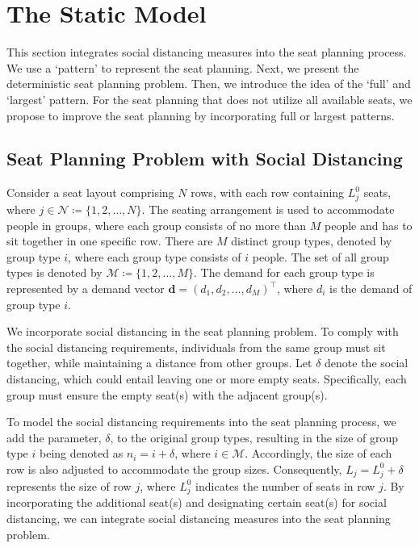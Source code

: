 \section{The Static Model}
This section integrates social distancing measures into the seat planning process. We use a `pattern' to represent the seat planning. Next, we present the deterministic seat planning problem. Then, we introduce the idea of the `full' and `largest' pattern. For the seat planning that does not utilize all available seats, we propose to improve the seat planning by incorporating full or largest patterns.

\subsection{Seat Planning Problem with Social Distancing}
Consider a seat layout comprising $N$ rows, with each row containing $L_j^0$ seats, where $j \in \mathcal{N} \coloneqq \{1,2, \ldots, N\}$. The seating arrangement is used to accommodate people in  groups, where each group consists of no more than $M$ people and has to sit together in one specific row. There are $M$ distinct group types, denoted by group type $i$, where each group type consists of $i$ people. The set of all group types is denoted by $\mathcal{M} \coloneqq \{1, 2, \ldots, M\}$. The demand for each group type is represented by a demand vector $\mathbf{d} = (d_1, d_2, \ldots, d_M)^{\intercal}$, where $d_i$ is the demand of group type $i$.

We incorporate social distancing in the seat planning problem. To comply with the social distancing requirements, individuals from the same group must sit together, while maintaining a distance from other groups. Let $\delta$ denote the social distancing, which could entail leaving one or more empty seats. Specifically, each group must ensure the empty seat(s) with the adjacent group(s).

To model the social distancing requirements into the seat planning process, we add the parameter, $\delta$, to the original group types, resulting in the size of group type $i$ being denoted as $n_i = i + \delta$, where $i \in \mathcal{M}$. Accordingly, the size of each row is also adjusted to accommodate the group sizes. Consequently, $L_j = L_j^{0} + \delta$ represents the size of row $j$, where $L_j^{0}$ indicates the number of seats in row $j$. By incorporating the additional seat(s) and designating certain seat(s) for social distancing, we can integrate social distancing measures into the seat planning problem.

